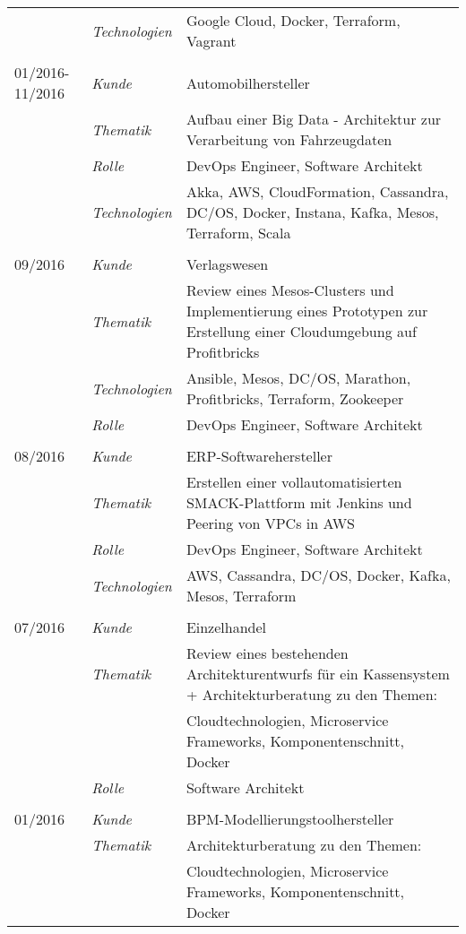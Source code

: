\begin{longtable}{@{}>{}p{4cm}>{\itshape}p{2cm}>{}p{9cm}}
\nopagebreak		& Technologien	& Google Cloud, Docker, Terraform, Vagrant\\
\\
01/2016-11/2016     & Kunde 	    & Automobilhersteller\\
\nopagebreak		& Thematik	    & Aufbau einer Big Data - Architektur zur Verarbeitung von Fahrzeugdaten\\
\nopagebreak		& Rolle 	    & DevOps Engineer, Software Architekt\\
\nopagebreak		& Technologien	& Akka, AWS, CloudFormation, Cassandra, DC/OS, Docker, Instana, Kafka, Mesos, Terraform, Scala\\
\\
09/2016             & Kunde 	    & Verlagswesen\\
\nopagebreak		& Thematik	    & Review eines Mesos-Clusters und Implementierung eines Prototypen zur Erstellung einer Cloudumgebung auf Profitbricks\\
\nopagebreak		& Technologien	& Ansible, Mesos, DC/OS, Marathon, Profitbricks, Terraform, Zookeeper\\
\nopagebreak		& Rolle 	    & DevOps Engineer, Software Architekt\\
\\
08/2016             & Kunde 	    & ERP-Softwarehersteller\\
\nopagebreak		& Thematik	    & Erstellen einer vollautomatisierten SMACK-Plattform mit Jenkins und Peering von VPCs in AWS\\
\nopagebreak		& Rolle 	    & DevOps Engineer, Software Architekt\\
\nopagebreak		& Technologien	& AWS, Cassandra, DC/OS, Docker, Kafka, Mesos, Terraform\\
\\
07/2016             & Kunde 	    & Einzelhandel\\
\nopagebreak		& Thematik	    & Review eines bestehenden Architekturentwurfs für ein Kassensystem + Architekturberatung zu den Themen:\\
\nopagebreak		&           	& Cloudtechnologien, Microservice Frameworks, Komponentenschnitt, Docker\\
\nopagebreak		& Rolle 	    & Software Architekt\\
\\
01/2016             & Kunde 	    & BPM-Modellierungstoolhersteller\\
\nopagebreak		& Thematik	    & Architekturberatung zu den Themen:\\
\nopagebreak		&           	& Cloudtechnologien, Microservice Frameworks, Komponentenschnitt, Docker\\

\end{longtable}

